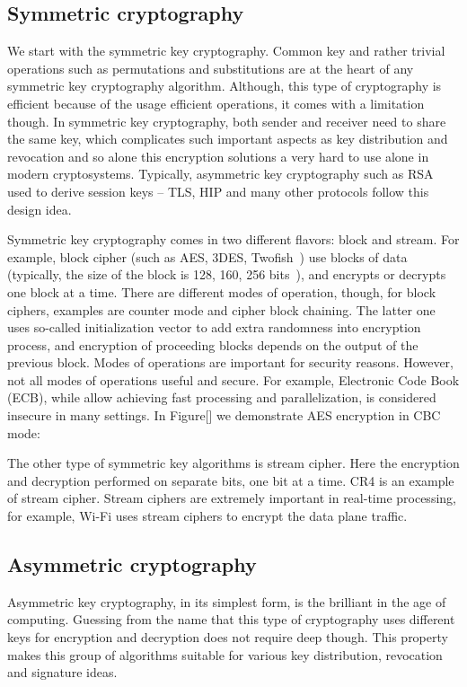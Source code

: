 \subsection{Symmetric cryptography}

We start with the symmetric key cryptography. Common key and rather 
trivial operations such as permutations and substitutions are at the 
heart of any symmetric key cryptography algorithm. Although, this type 
of cryptography is efficient because of the usage efficient operations, 
it comes with a limitation though. In symmetric key cryptography, 
both sender and receiver need to share the same key, which complicates 
such important aspects as key distribution and revocation and so alone 
this encryption solutions a very hard to use alone in modern cryptosystems. 
Typically, asymmetric key cryptography such as RSA used to derive session 
keys – TLS, HIP and many other protocols follow this design idea.

Symmetric key cryptography comes in two different flavors: block and stream. 
For example, block cipher (such as AES, 3DES, Twofish~\cite{Stinson:Cryptography}) 
use blocks of data (typically, the size of the block is 128, 160, 256 
bits~\cite{Stinson:Cryptography}), and encrypts or 
decrypts one block at a time. There are different modes of operation, though, 
for block ciphers, examples are counter mode and cipher block chaining. The latter 
one uses so-called initialization vector to add extra randomness into encryption 
process, and encryption of proceeding blocks depends on the output of the previous 
block. Modes of operations are important for security reasons. However, not all 
modes of operations useful and secure. For example, Electronic Code Book (ECB), 
while allow achieving fast processing and parallelization, is considered insecure in 
many settings. In Figure[] we demonstrate AES encryption in CBC mode:

The other type of symmetric key algorithms is stream cipher. Here the encryption 
and decryption performed on separate bits, one bit at a time. CR4 is an example 
of stream cipher. Stream ciphers are extremely important in real-time processing, 
for example, Wi-Fi uses stream ciphers to encrypt the data plane traffic.

\subsection{Asymmetric cryptography}

Asymmetric key cryptography, in its simplest form, is the brilliant in the age 
of computing. Guessing from the name that this type of cryptography uses different 
keys for encryption and decryption does not require deep though. This property makes 
this group of algorithms suitable for various key distribution, revocation and 
signature ideas. 

